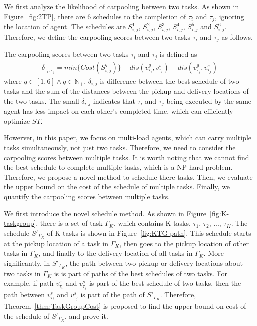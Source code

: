 \documentclass[sigconf,anonymous]{aamas}
\begin{document}
We first analyze the likelihood of carpooling between two tasks.
As shown in Figure~\ref{fig:2TP}, there are 6 schedules to the completion of $\tau_{i}$ and $\tau_{j}$, 
ignoring the location of agent.
The schedules are $S^{1}_{i,j}$, $S^{2}_{i,j}$, $S^{3}_{i,j}$, $S^{4}_{i,j}$, $S^{5}_{i,j}$ and $S^{6}_{i,j}$.
Therefore, we define the carpooling scores between two tasks $\tau_{i}$ and $\tau_{j}$ as follows.

\begin{definition}
\label{cp2}
    The carpooling scores between two tasks $\tau_{i}$ and $\tau_{j}$ is defined as 
    \begin{eqnarray}
    \label{eq:cp2}
        \delta_{\tau_{i}, \tau_{j}} = min\{Cost(S^{q}_{i,j})\} - 
        dis(v^{g}_{\tau_{i}}, v^{s}_{\tau_{i}}) - dis(v^{g}_{\tau_{j}}, v^{s}_{\tau_{j}})
    \end{eqnarray}
    where $q \in [1, 6] \wedge q \in \mathbb{N_+}$. $\delta_{i,j}$ is difference 
    between the best schedule of two tasks 
    and the sum of the distances between the pickup and delivery locations of the two tasks.
    The small $\delta_{i,j}$ indicates that $\tau_{i}$ and $\tau_{j}$ being executed by the same agent
    has less impact on each other's completed time, which can efficiently optimize ${ST}$.
\end{definition}

Howerver, in this paper, we focus on multi-load agents, 
which can carry multiple tasks simultaneously, not just two tasks.
Therefore, we need to consider the carpooling scores between multiple tasks.
It is worth noting that we cannot find the best schedule to complete multiple tasks, 
which is a NP-hard problem.
Therefore, we propose a novel method to schedule there tasks.
Then, we evaluate the upper bound on the cost of the schedule of multiple tasks.
Finally, we quantify the carpooling scores between multiple tasks.

We first introduce the novel schedule method.
As shown in Figure~\ref{fig:K-taskgroup}, there is a set of task $\Gamma_K$, 
which contains K tasks, $\tau_{1}$, $\tau_{2}$, ..., $\tau_{K}$.
The schedule $S'_{\Gamma_K}$ of K tasks is shown in Figure~\ref{fig:KTG-path}.
This schedule starts at the pickup location of a task in $\Gamma_K$, 
then goes to the pickup location of other tasks in $\Gamma_K$, 
and finally to the delivery location of all tasks in $\Gamma_K$.
More significantly, in $S'_{\Gamma_K}$,
the path between two pickup or delivery locations about two tasks in $\Gamma_K$ 
is is part of paths of the best schedules of two tasks.
For example, if path $v^{s}_{\tau_{i}}$ and $v^{s}_{\tau_{j}}$ is part of the best schedule of two tasks,
then the path between $v^{s}_{\tau_{i}}$ and $v^{s}_{\tau_{j}}$ is part of the path of $S'_{\Gamma_K}$.
Therefore, Theorem~\ref{thm:TaskGroupCost} is proposed to find the upper bound on cost of the schedule of $S'_{\Gamma_K}$,
and prove it.
\end{document}
